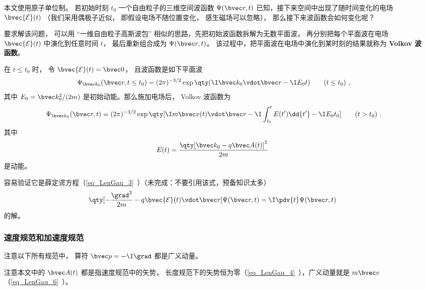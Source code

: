 
本文使用原子单位制。 若初始时刻 $t_0$ 一个自由粒子的三维空间波函数 $\Psi(\bvec r,t)$ 已知，接下来空间中出现了随时间变化的电场 $\bvec {\mathcal E}(t)$ （我们采用偶极子近似， 即假设电场不随位置变化， 感生磁场可以忽略）， 那么接下来波函数会如何变化呢？

要求解该问题， 可以用 “一维自由粒子高斯波包” 相似的思路，先把初始波函数拆解为无数平面波， 再分别把每个平面波在电场 $\bvec {\mathcal E}(t)$ 中演化到任意时间 $t$， 最后重新组合成为 $\Psi(\bvec r,t)$。 该过程中，把平面波在电场中演化到某时刻的结果就称为 \textbf{Volkov 波函数}。

在 $t \le t_0$ 时， 令 $\bvec {\mathcal E}(t) = \bvec 0$， 且波函数是如下平面波
\begin{equation}\label{eq_Volkov_3}
\Psi_{\bvec k_0}(\bvec r, t \le t_0) = (2\pi)^{-3/2} \exp\qty(\I\bvec k_0 \vdot \bvec r - \I E_0 t) \qquad (t \le t_0)~,
\end{equation}
其中 $E_0 = \bvec k_0^2/(2m)$ 是初始动能。那么施加电场后， Volkov 波函数为
\begin{equation}\label{eq_Volkov_4}
\Psi_{\bvec k_0}(\bvec r, t) = (2\pi)^{-3/2} \exp\qty[\I m\bvec v(t)\vdot \bvec r - \I\int_{t_0}^t E(t') \dd{t'} - \I E_0 t_0] \qquad (t > t_0)~.
\end{equation}
其中
\begin{equation}
E(t) = \frac{\qty[\bvec k_0 - q\bvec A(t)]^2}{2m}~
\end{equation}
是动能。

容易验证它是薛定谔方程（\autoref{eq_LenGau_3}~）（未完成：不要引用该式，预备知识太多）
\begin{equation}
\qty[-\frac{\grad^2}{2m} - q \bvec {\mathcal E}(t) \vdot \bvec r] \Psi(\bvec r,t) = \I \pdv{t} \Psi(\bvec r,t)~
\end{equation}
的解。

\subsubsection{速度规范和加速度规范}
注意以下所有规范中， 算符 $\bvec p = -\I \grad$ 都是广义动量。

注意本文中的 $\bvec A(t)$ 都是指速度规范中的矢势， 长度规范下的矢势恒为零（\autoref{eq_LenGau_4}~），广义动量就是 $m\bvec v$（\autoref{eq_LenGau_6}~）。

